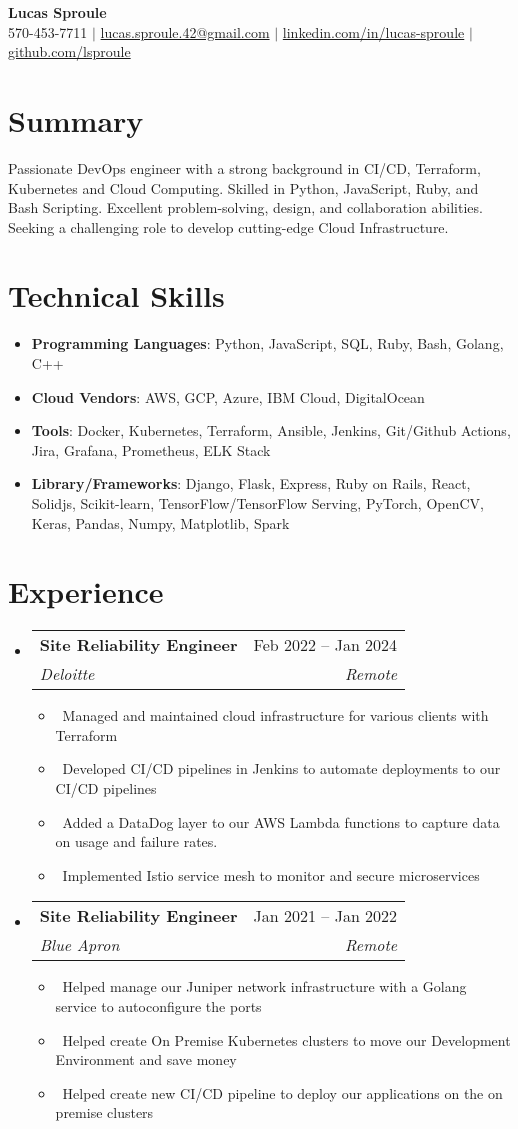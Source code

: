 \documentclass[letterpaper,10pt]{article}
\makeatletter
\newcommand{\resumeItem}[1]{\item\small{#1}}
\newcommand{\resumeSubheading}[4]{
\vspace{-1pt}\item
  \begin{tabular*}{0.97\textwidth}[t]{l@{\extracolsep{\fill}}r}
    \textbf{#1} & #2 \\
    \textit{#3} & \textit{#4} \\
  \end{tabular*}\vspace{-7pt}
}
\newcommand{\resumeSubHeadingList}{\begin{itemize}[leftmargin=0.15in, label={}]}
\newcommand{\resumeSubHeadingListEnd}{\end{itemize}}
\makeatother
\begin{document}
\begin{center}
  \textbf{\Huge Lucas Sproule} \\
  \small 570-453-7711 $|$ \href{mailto:lucas.sproule.42@gmail.com}{lucas.sproule.42@gmail.com} $|$ 
  \href{https://linkedin.com/in/lucas-sproule}{linkedin.com/in/lucas-sproule} $|$
  \href{https://github.com/lsproule}{github.com/lsproule}
\end{center}

\section*{Summary}
Passionate DevOps engineer with a strong background in CI/CD, Terraform, Kubernetes and Cloud Computing. Skilled in Python, JavaScript, Ruby, and Bash Scripting. Excellent problem-solving, design, and collaboration abilities. Seeking a challenging role to develop cutting-edge Cloud Infrastructure.

\section{Technical Skills}
\resumeSubHeadingList
  \resumeItem{\textbf{Programming Languages}: Python, JavaScript, SQL, Ruby, Bash, Golang, C++}
  \resumeItem{\textbf{Cloud Vendors}: AWS, GCP, Azure, IBM Cloud, DigitalOcean}
  \resumeItem{\textbf{Tools}: Docker, Kubernetes, Terraform, Ansible, Jenkins, Git/Github Actions, Jira, Grafana, Prometheus, ELK Stack}
  \resumeItem{\textbf{Library/Frameworks}: Django, Flask, Express, Ruby on Rails, React, Solidjs, Scikit-learn, TensorFlow/TensorFlow Serving, PyTorch, OpenCV, Keras, Pandas, Numpy, Matplotlib, Spark}
\resumeSubHeadingListEnd
\section{Experience}
\resumeSubHeadingList
  \resumeSubheading
      {Site Reliability Engineer}{Feb 2022 -- Jan 2024}
      {Deloitte}{Remote}
      \resumeSubHeadingList
          \resumeItem{\textbullet\ Managed and maintained cloud infrastructure for various clients with Terraform}
          \resumeItem{\textbullet\ Developed CI/CD pipelines in Jenkins to automate deployments to our CI/CD pipelines}
          \resumeItem{\textbullet\ Added a DataDog layer to our AWS Lambda functions to capture data on usage and failure rates.}
          \resumeItem{\textbullet\ Implemented Istio service mesh to monitor and secure microservices}

      \resumeSubHeadingListEnd
  \resumeSubheading
      {Site Reliability Engineer}{Jan 2021 -- Jan 2022}
      {Blue Apron}{Remote}
      \resumeSubHeadingList
          \resumeItem{\textbullet\ Helped manage our Juniper network infrastructure with a Golang service to autoconfigure the ports}
          \resumeItem{\textbullet\ Helped create On Premise Kubernetes clusters to move our Development Environment and save money}
          \resumeItem{\textbullet\ Helped create new CI/CD pipeline to deploy our applications on the on premise clusters}
      \resumeSubHeadingListEnd
\resumeSubHeadingListEnd
\end{document}
